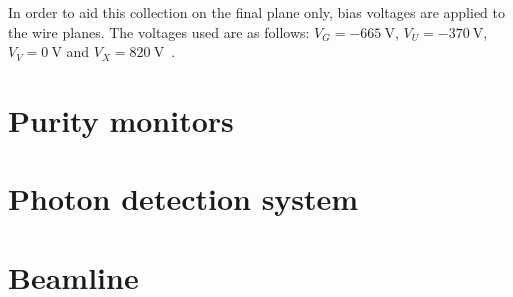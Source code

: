 In order to aid this collection on the final plane only, bias voltages are applied to the wire planes.
The voltages used are as follows: $V_{G} = \SI{-665}{\volt}$, $V_{U} = \SI{-370}{\volt}$, $V_{V} = \SI{0}{\volt}$ and $V_{X} = \SI{+820}{\volt}$~\cite{protodunePerformance}.

\section{Purity monitors}
\label{sec:protodune:prms}

\section{Photon detection system}
\label{sec:protodune:pds}

\section{Beamline}
\label{sec:protodune:beam}